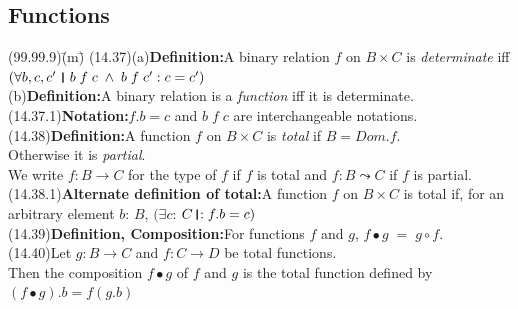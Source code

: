\documentclass{amsart}
\newcommand{\lgap}{2pt}                             %
\newcommand{\thedr}{\rule[-.25ex]{.32mm}{1.75ex}}   %
\newcommand{\dr}{\;\,\thedr\,\;}                    %
\newcommand{\rb}{:}                                 %
\newcommand{\drrb}{\;\thedr\,{:}\;}                 %
\newcommand{\all}{\forall}                          %
\newcommand{\ext}{\exists}                          %
\begin{document}
\subsection*{Functions}
\begin{tabbing}
(99.99.9)\;\=(m)\;\=\kill
(14.37)\>(a)\>\textbf{Definition:}\quad A binary relation $f$ on $B\times C$ is \emph{determinate} iff\\[\lgap]
       \>   \>$(\all b, c, c'\dr b\;f\;c \;\land\; b\;f\;c' \rb c = c')$\\[\lgap]
       \>(b)\>\textbf{Definition:}\quad A binary relation is a \emph{function} iff it is determinate.\\[\lgap]
(14.37.1)\>\textbf{Notation:}\quad $f.b=c$\; and\; $b\; f\; c$\; are interchangeable notations.\\[\lgap]
(14.38)\>\textbf{Definition:}\quad A function $f$ on $B\times C$ is \emph{total} if $B=Dom.f$.\\[\lgap]
       \>Otherwise it is \emph{partial}.\\[\lgap]
       \>We write $f:B\to C$ for the type of $f$ if $f$ is total and $f:B\leadsto C$ if $f$ is partial.\\[\lgap]
(14.38.1)\>\textbf{Alternate definition of total:}\quad A function $f$ on $B\times C$ is total if, for an\\[\lgap]
         \> arbitrary element $b$: $B$, $(\ext c$: $C\drrb f.b=c)$\\[\lgap]
(14.39)\>\textbf{Definition, Composition:}\quad For functions $f$ and $g$, $f\bullet g \;=\; g\circ f$.\\[\lgap]
(14.40)\>Let $g: B\to C$ and $f: C\to D$ be total functions.\\[\lgap]
       \>Then the composition $f\bullet g$ of $f$ and $g$ is the total function defined by\\[\lgap]
       \>$(f\bullet g).b = f(g.b)$\\[\lgap]
\end{tabbing}
\end{document}

